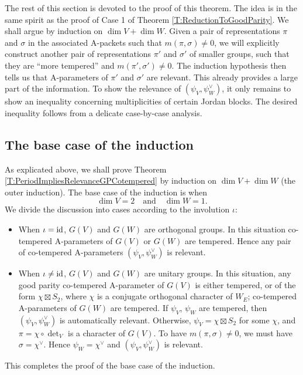 \documentclass[11pt,letterpaper]{amsart}
\theoremstyle{plain}
\newcounter{theorem}[section]
\numberwithin{theorem}{section}
\numberwithin{equation}{subsection}
\theoremstyle{remark}
\begin{document}
\vskip 5pt

The rest of this section is devoted to the proof of this theorem. The idea is in the same spirit as the proof of Case 1 of Theorem \ref{T:ReductionToGoodParity}. We shall argue by induction on $\dim V + \dim W$.
Given a pair of representations $\pi$ and $\sigma$ in the associated A-packets such that $m\left(\pi,\sigma\right)\neq 0$, we will explicitly construct another pair of representations $\pi'$ and $\sigma'$ of smaller groups, such that they are ``more tempered'' and $m\left(\pi',\sigma'\right)\neq 0$. The induction hypothesis then tells us that A-parameters of $\pi'$ and $\sigma'$ are relevant. This already provides a large part of the information. To show the relevance of $\left(\psi_V,\psi_W^\vee\right)$, it only remains to show an inequality concerning multiplicities of certain Jordan blocks. The desired inequality follows from a delicate case-by-case analysis.

\subsection{The base case of the induction} %
\label{sub:the_base_case}

As explicated above, we shall prove Theorem \ref{T:PeriodImpliesRelevanceGPCotempered} by induction on $\dim V + \dim W$ (the outer induction). The base case of the induction is when
\[
    \dim V =2 \quad \text{and} \quad \dim W=1.
\]
We divide the discussion into cases according to the involution $\iota$:
\begin{itemize}
    \item When $\iota={\rm id}$, $G(V)$ and $G(W)$ are orthogonal groups. In this situation co-tempered A-parameters of $G(V)$ or $G(W)$ are tempered. Hence any pair of co-tempered A-parameters $\left(\psi_V,\psi_W^\vee\right)$ is relevant. 

    \vskip 5pt

    \item When $\iota \neq {\rm id}$, $G(V)$ and $G(W)$ are unitary groups. In this situation, any good parity co-tempered A-parameter of $G(V)$ is either tempered, or of the form $\chi\boxtimes S_2$, where $\chi$ is a conjugate orthogonal character of $W_E$; co-tempered A-parameters of $G(W)$ are tempered. If $\psi_V$, $\psi_W$ are tempered, then $\left(\psi_V,\psi_W^\vee\right)$ is automatically relevant. Otherwise, $\psi_V=\chi\boxtimes S_2$ for some $\chi$, and $\pi=\chi\circ\det_V$ is a character of $G(V)$. To have $m\left(\pi,\sigma\right)\neq0$, we must have $\sigma=\chi^\vee$. Hence $\psi_W=\chi^\vee$ and $\left(\psi_V,\psi_W^\vee\right)$ is relevant.
\end{itemize}
\vskip 5pt
This completes the proof of the base case of the induction.
\end{document}
